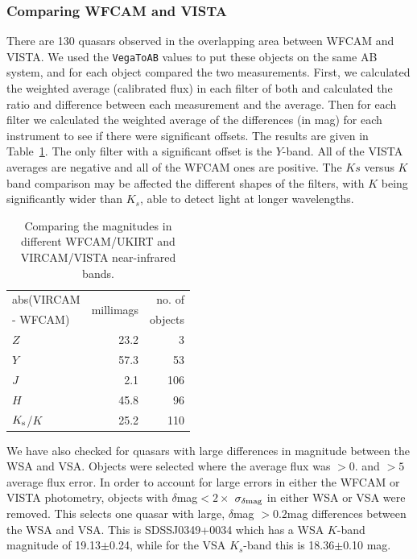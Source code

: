 \documentclass[usenatbib]{mnras}
\begin{document}
  \subsubsection{Comparing WFCAM and VISTA}
  There are 130 quasars observed in the overlapping area between WFCAM
  and VISTA. We used the {\tt VegaToAB} values to put these objects on
  the same AB system, and for each object compared the two
  measurements. First, we calculated the weighted average (calibrated
  flux) in each filter of both and calculated the ratio and difference
  between each measurement and the average.  Then for each filter we
  calculated the weighted average of the differences (in mag) for each
  instrument to see if there were significant offsets. The results are
  given in Table~\ref{tab:WFCAM_vs_VISTA}.  The only filter with a
  significant offset is the $Y$-band. All of the VISTA averages are
  negative and all of the WFCAM ones are positive. The $Ks$ versus $K$
  band comparison may be affected the different shapes of the filters,
  with $K$ being significantly wider than $K_s$, able to detect light at
  longer wavelengths.
  \begin{table}
    \centering
    \begin{tabular}{l r r}
      \hline  \hline
      abs(VIRCAM & \multirow{2}{*}{millimags} &  no. of  \\
      -  WFCAM)      &                                        &  objects \\
      \hline
      $Z$                 &  23.2 	& 3 \\
      $Y$                 &  57.3 	& 53 \\
      $J$                  &    2.1 	& 106 \\
      $H$                 &  45.8     &  96 \\
      $K_{\rm s}$/$K$ &  25.2     & 110 \\
      \hline  \hline
    \end{tabular}
    \caption{Comparing the magnitudes in different WFCAM/UKIRT and 
      VIRCAM/VISTA near-infrared bands.}
    \label{tab:WFCAM_vs_VISTA}
  \end{table}

  We have also checked for quasars with large differences in magnitude
  between the WSA and VSA. Objects were selected where the average flux
  was $>0.$ and $>5$ average flux error. In order to account for large
  errors in either the WFCAM or VISTA photometry, objects with
  $\delta$mag$ < 2 \times$ $\sigma_{\delta\rm mag}$ in either WSA or VSA
  were removed. This selects one quasar with large, $\delta$mag
  $>0.2$mag differences between the WSA and VSA. This is SDSSJ0349+0034
  which has a WSA $K$-band magnitude of 19.13$\pm$0.24, while for the
  VSA $K_s$-band this is 18.36$\pm$0.10 mag. 
\end{document}
